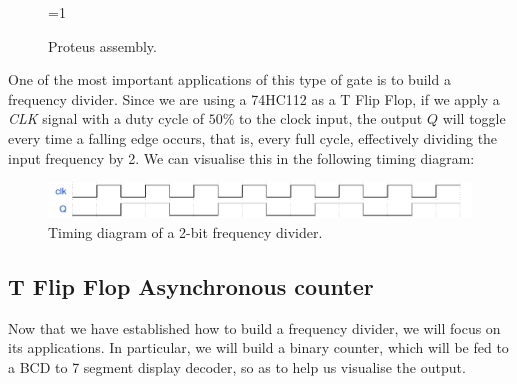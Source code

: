 \documentclass[a4paper, 11pt, oneside]{article}
\begin{document}
\begin{figure}[H]
    \centering
    
    \ifnum\value{ANIMATION}=1 {
    } 
    \fi
    
    \caption{Proteus assembly.}
    \label{fig:PROTEUS_T}
\end{figure}

\clearpage

One of the most important applications of this type of gate is to build a frequency divider. Since we are using a 74HC112 as a T Flip Flop, if we apply a \textit{CLK} signal with a duty cycle of $50\%$ to the clock input, the output $Q$ will toggle every time a falling edge occurs, that is, every full cycle, effectively dividing the input frequency by 2. We can visualise this in the following timing diagram: \medskip

\begin{figure}[H]
    \centering
    \includegraphics[scale = 0.73]{Graphics/Practice 2/GRAPHICS/TIMING/EX2.pdf}
    \caption{Timing diagram of a 2-bit frequency divider.}
    \label{fig:timing_1}
\end{figure}

\subsection{T Flip Flop Asynchronous counter}

Now that we have established how to build a frequency divider, we will focus on its applications. In particular, we will build a binary counter, which will be fed to a BCD to 7 segment display decoder, so as to help us visualise the output.\medskip
\end{document}
